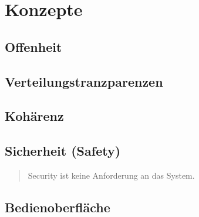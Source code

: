\chapter{Konzepte}
\begin{quote}
	
\end{quote}

\section{Offenheit}
\begin{quote}
	
\end{quote}
	
\section{Verteilungstranzparenzen}
\begin{quote}
	
\end{quote}

\section{Kohärenz}
\begin{quote}
\end{quote}
\section{Sicherheit (Safety)}
\begin{quote}
Security ist keine Anforderung an das System.
\end{quote}
\section{Bedienoberfläche}
\begin{quote}
	
\end{quote}

